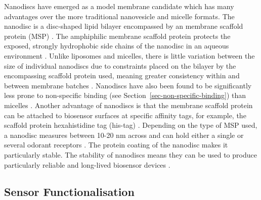 \documentclass[
  a4paper,
]{scrbook}
\begin{document}
Nanodiscs have emerged as a model membrane candidate which has many
advantages over the more traditional nanovesicle and micelle formats.
The nanodisc is a disc-shaped lipid bilayer encompassed by an membrane
scaffold protein (MSP) \autocite{Nath2007,Bayburt2010,Yang2018}. The
amphiphilic membrane scaffold protein protects the exposed, strongly
hydrophobic side chains of the nanodisc in an aqueous environment
\autocite{Fruh2011,Yang2018}. Unlike liposomes and micelles, there is
little variation between the size of individual nanodiscs due to
constraints placed on the bilayer by the encompassing scaffold protein
used, meaning greater consistency within and between membrane batches
\autocite{Nath2007,Fruh2011}. Nanodiscs have also been found to be
significantly less prone to non-specific binding (see
Section~\ref{sec-non-specific-binding}) than micelles
\autocite{Fruh2011}. Another advantage of nanodiscs is that the membrane
scaffold protein can be attached to biosensor surfaces at specific
affinity tags, for example, the scaffold protein hexahistidine tag
(his-tag) \autocite{Bayburt2010,Fruh2011}. Depending on the type of MSP
used, a nanodisc measures between 10-20 nm across and can hold either a
single or several odorant receptors \autocite{Nath2007,Bayburt2010}. The
protein coating of the nanodisc makes it particularly stable. The
stability of nanodiscs means they can be used to produce particularly
reliable and long-lived biosensor devices
\autocite{Goldsmith2011,Yang2018,Moon2020,Cheema2021}.

\hypertarget{sec-sensor-types}{%
\subsection{Sensor Functionalisation}\label{sec-sensor-types}}
\end{document}
